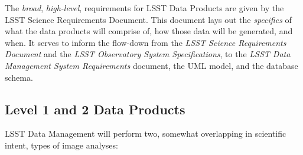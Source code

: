\documentclass[12pt]{article}
\begin{document}
\vspace{1em}

The {\em broad}, {\em high-level}, requirements for LSST Data Products are
given by the LSST Science Requirements Document. This document lays out the
{\em specifics} of what the data products will comprise of, how those data
will be generated, and when. It serves to inform the flow-down from the {\em
LSST Science Requirements Document} and the {\em LSST Observatory System
Specifications}, to the {\em LSST Data Management System Requirements}
document, the UML model, and the database schema.

\subsection{Level 1 and 2 Data Products}

LSST Data Management will perform two, somewhat overlapping in scientific
intent, types of image analyses:
\end{document}

